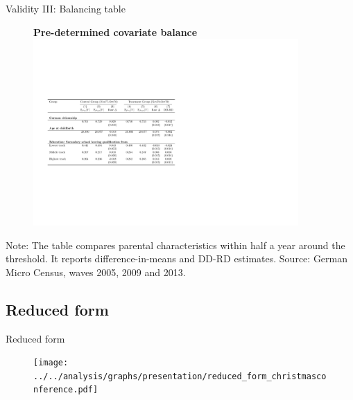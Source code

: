 \documentclass[usenames,dvipsnames]{beamer} %
\begin{document}
\begin{frame}{Validity III: Balancing table}
\begin{figure}
\textbf{Pre-determined covariate balance}
\includegraphics[width=0.9\textwidth]{../../analysis/graphs/presentation/parental_covariate_balance}
\end{figure}
\begin{minipage}{1.0\linewidth}
\begin{center}\vspace{-1cm}
\tiny \flushleft Note: The table compares parental characteristics within half a year around the threshold. It reports difference-in-means and DD-RD estimates. Source: German Micro Census, waves 2005, 2009 and 2013. 
\end{center}
\end{minipage}

\hyperlink{BACK_FROM_VALIDITY}{}
\end{frame}
\subsection*{Reduced form}
\begin{frame}{Reduced form}
\label{RF}
\begin{figure}\centering
\texttt{[image: ../../analysis/graphs/presentation/reduced\_form\_christmasconference.pdf]}
\end{figure}
\hyperlink{BACK_FROM_RF}{}
\end{frame}
\end{document}
